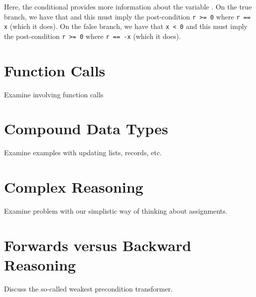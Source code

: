 Here, the conditional provides more information about the variable .  On the true branch, we have that  and this must imply the post-condition \lstinline{r >= 0} where \lstinline{r == x} (which it does).  On the false branch, we have that \lstinline{x < 0} and this must imply the post-condition \lstinline{r >= 0} where \lstinline{r == -x} (which it does).

\section{Function Calls}
Examine involving function calls

\section{Compound Data Types}
Examine examples with updating lists, records, etc.

\section{Complex Reasoning}
Examine problem with our simplistic way of thinking about assignments.

\section{Forwards versus Backward Reasoning}
Discuss the so-called weakest precondition transformer.


